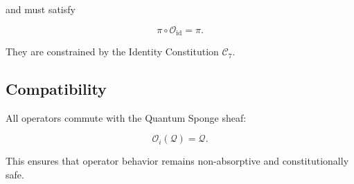 and must satisfy

\[
\pi \circ \mathcal{O}_{\mathrm{id}} = \pi.
\]

They are constrained by the Identity Constitution $\mathcal{C}_7$.


\subsection{Compatibility}

All operators commute with the Quantum Sponge sheaf:

\[
\mathcal{O}_i(\mathcal{Q}) = \mathcal{Q}.
\]

This ensures that operator behavior remains non-absorptive and
constitutionally safe.

